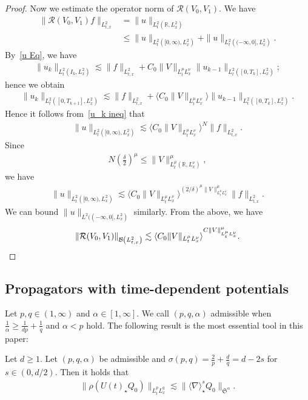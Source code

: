 \documentclass[10pt,a4paper]{amsart}
\newcommand{\CB}{\mathcal{B}}
\newcommand{\CR}{\mathcal{R}}
\newcommand{\FS}{\mathfrak{S}}
\newcommand{\al}{\alpha}
\newcommand{\de}{\delta}
\newcommand{\si}{\sigma}
\newcommand{\rh}{\rho}
\newcommand{\K}[1]{\left(#1\right)}
\newcommand{\Br}[1]{\langle #1 \rangle}
\newcommand*\bra[1]{\langle#1\rangle}
\newcommand{\I}{\infty}
\newcommand{\sd}{\langle \nabla \rangle}
\newcommand{\st}{\star}
\newcommand{\R}{\mathbb{R}}
\newcommand{\ls}{\lesssim}
\begin{document}
\begin{proof}
Now we estimate the operator norm of $\CR(V_0, V_1)$. We have
\begin{align}
\|\CR(V_0,V_1)f\|_{L^2_{t,x}} &= \|u\|_{L^2_t\left(\R,L^2_x\right)} \\
&\leq \|u\|_{L^2_t\left([0,\I),L^2_x\right)} + \|u\|_{L^2_t\left((-\I,0],L^2_x\right)}.
\end{align}
By~\eqref{u Eq}, we have
\begin{align}\label{u_k ineq}
\|u_k\|_{L^2_t\left(I_k,L^2_x\right)}
\ls \|f\|_{L^2_{t,x}} + C_0\|V\|_{L^\mu_t L^\nu_x} \|u_{k-1}\|_{L^2_t\left([0,T_k],L^2_x\right)};
\end{align}
hence we obtain
\begin{align}
\|u_k\|_{L^2_t\left([0,T_{k+1}],L^2_x\right)}
\ls \|f\|_{L^2_{t,x}} + \Br{C_0\|V\|_{L^\mu_t L^\nu_x}}\|u_{k-1}\|_{L^2_t\left([0,T_k],L^2_x\right)}.
\end{align}
Hence it follows from~\eqref{u_k ineq} that
\begin{align}
\|u\|_{L^2_t\left([0,\I),L^2_x\right)} \ls \bra{C_0 \|V\|_{L^\mu_tL^\nu_x}}^N \|f\|_{L^2_{t,x}}.
\end{align}
Since
\begin{align}
N \K{\frac{\de}{2}}^\mu \leq \|V\|_{L^\mu_t\left(\R,L^\nu_x\right)}^\mu,
\end{align}
we have
\begin{align}
\|u\|_{L^2_t\left([0,\I),L^2_x\right)}
\lesssim \bra{C_0\|V\|_{L^\mu_tL^\nu_x}}^{(2/\de)^{\mu}\|V\|_{L^\mu_tL^\nu_x}^\mu} \|f\|_{L^2_{t,x}}.
\end{align}
We can bound $\|u\|_{L^2((-\I,0],L^2_x)}$ similarly. From the above, we have
\begin{equation}
\|\CR(V_0,V_1)\|_{\CB\left(L^2_{t,x}\right)}
\ls \bra{C_0\|V\|_{L^\mu_tL^\nu_x}}^{C\|V\|_{L^\mu_tL^\nu_x}^\mu}.\qedhere
\end{equation}
\end{proof}

\subsection{Propagators with time-dependent potentials} 

Let $p,q \in (1,\I)$ and $\al \in [1,\I]$. We call $(p,q,\al)$ admissible when $\frac{1}{\al} \ge \frac{1}{dp} + \frac{1}{q}$ and $\al < p$ hold. The following result is the most essential tool in this paper:

\begin{theo} \label{Ostri}
Let $d \ge 1$. Let $(p,q,\al)$ be admissible and $\si(p,q)=\frac{2}{p}+\frac{d}{q}=d-2s$ for $s \in (0,d/2)$. Then it holds that
\begin{align}
\|\rh(U(t)_\st Q_0)\|_{L^p_t L^q_x} \ls \|\sd^s_\st Q_0\|_{\FS^\al}.
\end{align}
\end{theo}
\end{document}
